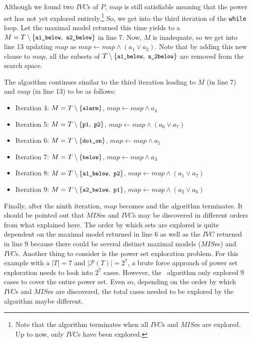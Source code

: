 Although we found two $IVC$s of $P$, $map$ is still satisfiable meaning that the power set has not yet explored entirely.\footnote{Note that the algorithm terminates when all $IVC$s and $MIS$es are explored. Up to now, only $IVC$s have been explored.} So, we get into the third iteration of the \texttt{while} loop. Let the maximal model returned this time
yields to a
$M = T \setminus \{ \small{ \texttt{a1\_below},~\texttt{a2\_below}}\}$
 in line 7.
Now, $M$ is inadequate, so we get into line 13 updating $map$ as
$map \leftarrow map \wedge (a_1 \vee a_2)$.
Note that by adding this new clause to $map$,
all the subsets of $T \setminus \{ \small{ \texttt{a1\_below},~\texttt{a\_2below}}\}$
are removed from the search space.

The algorithm continues similar to the third iteration leading to $M$ (in line 7) and $map$ (in line 13) to be as follows:
\begin{itemize}
  \item Iteration 4:  $M = T \setminus \{ \small{ \texttt{alarm}}\}$, $map \leftarrow map \wedge a_4$

  \item Iteration 5: $M = T \setminus \{ \small{ \texttt{p1},~\texttt{p2}}\}$, $map \leftarrow map \wedge (a_6 \vee a_7)$

  \item Iteration 6: $M = T \setminus \{ \small{ \texttt{doi\_on}}\}$, $map \leftarrow map \wedge a_5$

  \item Iteration 7: $M = T \setminus \{ \small{ \texttt{below}}\}$, $map \leftarrow map \wedge a_3$

  \item Iteration 8: $M = T \setminus \{ \small{ \texttt{a1\_below},~\texttt{p2}}\}$, $map \leftarrow map \wedge (a_1 \vee a_7)$

  \item Iteration 9: $M = T \setminus \{ \small{ \texttt{a2\_below},~\texttt{p1}}\}$, $map \leftarrow map \wedge (a_2 \vee a_6)$
\end{itemize}
Finally, after the ninth iteration, $map$ becomes \unsat and the algorithm terminates.
It should be pointed out that $MIS$es and $IVC$s may be discovered in different orders from what explained here. The order by which sets are explored is
quite dependent on the maximal model returned in line 6 as well as the $IVC$ returned in line 9 because there could be several distinct maximal models ($MIS$es) and $IVC$s. Another thing to consider is the power set exploration problem. For this example with a $|T| = 7$ and $|\mathcal{P}(T)| = 2^7$, a brute force approach of power set exploration needs to look into  $2^7$ cases. However, the \aivcalg ~algorithm only explored 9 cases to cover the entire power set. Even so, depending on the order by which $IVC$s and $MIS$es are discovered, the total cases needed to be explored by the algorithm maybe different.

